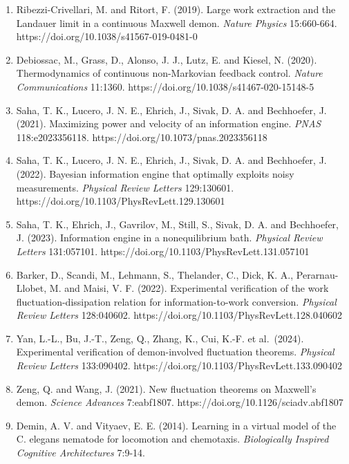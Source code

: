 \documentclass[
  10pt,
]{article}
\newcounter{none} %
\begin{document}
\begin{enumerate}
  of an information machine with tunable temporal correlations.
  \emph{Physical Review Letters} 121:180601.
  https://doi.org/10.1103/PhysRevLett.121.180601
\item
  Ribezzi-Crivellari, M. and Ritort, F. (2019). Large work extraction
  and the Landauer limit in a continuous Maxwell demon. \emph{Nature
  Physics} 15:660-664. https://doi.org/10.1038/s41567-019-0481-0
\item
  Debiossac, M., Grass, D., Alonso, J. J., Lutz, E. and Kiesel, N.
  (2020). Thermodynamics of continuous non-Markovian feedback control.
  \emph{Nature Communications} 11:1360.
  https://doi.org/10.1038/s41467-020-15148-5
\item
  Saha, T. K., Lucero, J. N. E., Ehrich, J., Sivak, D. A. and
  Bechhoefer, J. (2021). Maximizing power and velocity of an information
  engine. \emph{PNAS} 118:e2023356118.
  https://doi.org/10.1073/pnas.2023356118
\item
  Saha, T. K., Lucero, J. N. E., Ehrich, J., Sivak, D. A. and
  Bechhoefer, J. (2022). Bayesian information engine that optimally
  exploits noisy measurements. \emph{Physical Review Letters}
  129:130601. https://doi.org/10.1103/PhysRevLett.129.130601
\item
  Saha, T. K., Ehrich, J., Gavrilov, M., Still, S., Sivak, D. A. and
  Bechhoefer, J. (2023). Information engine in a nonequilibrium bath.
  \emph{Physical Review Letters} 131:057101.
  https://doi.org/10.1103/PhysRevLett.131.057101
\item
  Barker, D., Scandi, M., Lehmann, S., Thelander, C., Dick, K. A.,
  Perarnau-Llobet, M. and Maisi, V. F. (2022). Experimental verification
  of the work fluctuation-dissipation relation for information-to-work
  conversion. \emph{Physical Review Letters} 128:040602.
  https://doi.org/10.1103/PhysRevLett.128.040602
\item
  Yan, L.-L., Bu, J.-T., Zeng, Q., Zhang, K., Cui, K.-F. et al.~(2024).
  Experimental verification of demon-involved fluctuation theorems.
  \emph{Physical Review Letters} 133:090402.
  https://doi.org/10.1103/PhysRevLett.133.090402
\item
  Zeng, Q. and Wang, J. (2021). New fluctuation theorems on Maxwell's
  demon. \emph{Science Advances} 7:eabf1807.
  https://doi.org/10.1126/sciadv.abf1807
\item
  Demin, A. V. and Vityaev, E. E. (2014). Learning in a virtual model of
  the C. elegans nematode for locomotion and chemotaxis.
  \emph{Biologically Inspired Cognitive Architectures} 7:9-14.

\end{enumerate}
\end{document}
